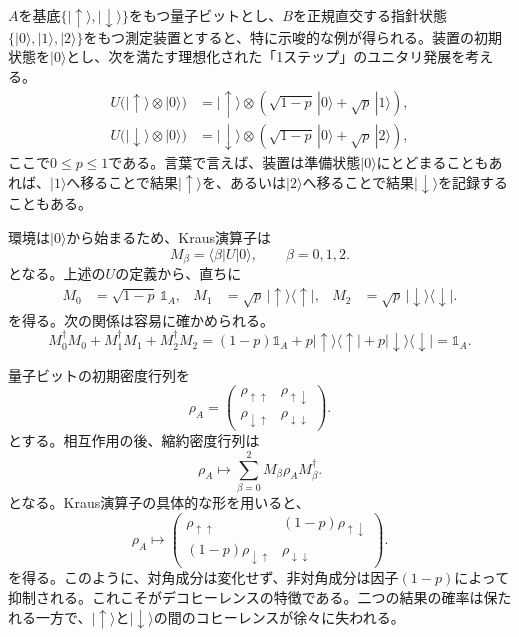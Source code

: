\documentclass[a4paper,11pt,oneside]{article}
\theoremstyle{definition}
\numberwithin{equation}{section}
\begin{document}
$A$を基底$\{|\uparrow\rangle,|\downarrow\rangle\}$をもつ量子ビットとし、$B$を正規直交する指針状態$\{|0\rangle,|1\rangle,|2\rangle\}$をもつ測定装置とすると、特に示唆的な例が得られる。装置の初期状態を$|0\rangle$とし、次を満たす理想化された「1ステップ」のユニタリ発展を考える。
\begin{align}
U\bigl(|\uparrow\rangle\otimes|0\rangle\bigr)
&=
|\uparrow\rangle\otimes
\left(\sqrt{1-p}\,|0\rangle+\sqrt{p}\,|1\rangle\right) ,
\\
U\bigl(|\downarrow\rangle\otimes|0\rangle\bigr)
&=
|\downarrow\rangle\otimes
\left(\sqrt{1-p}\,|0\rangle+\sqrt{p}\,|2\rangle\right) ,
\end{align}
ここで$0\le p\le 1$である。言葉で言えば、装置は準備状態$|0\rangle$にとどまることもあれば、$|1\rangle$へ移ることで結果$|\uparrow\rangle$を、あるいは$|2\rangle$へ移ることで結果$|\downarrow\rangle$を記録することもある。



環境は$|0\rangle$から始まるため、Kraus演算子は
\begin{equation}
M_\beta = \langle \beta|U|0\rangle ,
\qquad
\beta=0,1,2 .
\end{equation}
となる。上述の$U$の定義から、直ちに
\begin{align}
M_0 &= \sqrt{1-p}\,\mathds{1} _A , &
M_1 &= \sqrt{p}\,|\uparrow\rangle\langle\uparrow| ,  &
M_2 &= \sqrt{p}\,|\downarrow\rangle\langle\downarrow| .
\end{align}
を得る。次の関係は容易に確かめられる。
\begin{equation}
M_0^\dagger M_0 + M_1^\dagger M_1 + M_2^\dagger M_2
=
(1-p)\mathds{1} _A + p|\uparrow\rangle\langle\uparrow| + p|\downarrow\rangle\langle\downarrow|
=
\mathds{1} _A .
\end{equation}


量子ビットの初期密度行列を
\begin{equation}
\rho_A =
\begin{pmatrix}
\rho_{\uparrow\uparrow} & \rho_{\uparrow\downarrow} \\
\rho_{\downarrow\uparrow} & \rho_{\downarrow\downarrow}
\end{pmatrix} .
\end{equation}
とする。相互作用の後、縮約密度行列は
\begin{equation}
\rho_A \mapsto \sum_{\beta=0}^2 M_\beta \rho_A M_\beta^\dagger .
\end{equation}
となる。Kraus演算子の具体的な形を用いると、
\begin{equation}
\rho_A \mapsto
\begin{pmatrix}
\rho_{\uparrow\uparrow} & (1-p)\rho_{\uparrow\downarrow} \\
(1-p)\rho_{\downarrow\uparrow} & \rho_{\downarrow\downarrow}
\end{pmatrix} .
\end{equation}
を得る。このように、対角成分は変化せず、非対角成分は因子$(1-p)$によって抑制される。これこそがデコヒーレンスの特徴である。二つの結果の確率は保たれる一方で、$|\uparrow\rangle$と$|\downarrow\rangle$の間のコヒーレンスが徐々に失われる。
\end{document}
